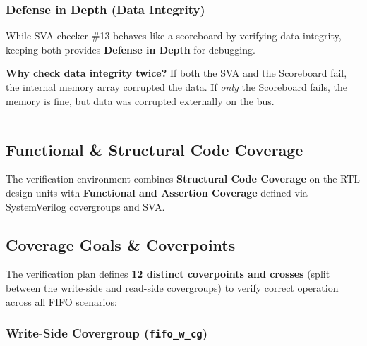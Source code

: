 \documentclass[
]{article}
\begin{document}
\subsubsection{Defense in Depth (Data
Integrity)}\label{defense-in-depth-data-integrity}

While SVA checker \#13 behaves like a scoreboard by verifying data
integrity, keeping both provides \textbf{Defense in Depth} for
debugging.

\textbf{Why check data integrity twice?} If both the SVA and the
Scoreboard fail, the internal memory array corrupted the data. If
\emph{only} the Scoreboard fails, the memory is fine, but data was
corrupted externally on the bus.

\begin{center}\rule{0.5\linewidth}{0.5pt}\end{center}

\subsection{Functional \& Structural Code
Coverage}\label{functional--structural-code-coverage}

The verification environment combines \textbf{Structural Code Coverage}
on the RTL design units with \textbf{Functional and Assertion Coverage}
defined via SystemVerilog covergroups and SVA.

\subsection{Coverage Goals \&
Coverpoints}\label{coverage-goals--coverpoints}

The verification plan defines \textbf{12 distinct coverpoints and
crosses} (split between the write-side and read-side covergroups) to
verify correct operation across all FIFO scenarios:

\subsubsection{\texorpdfstring{Write-Side Covergroup
(\texttt{fifo\_w\_cg})}{Write-Side Covergroup (fifo\_w\_cg)}}\label{write-side-covergroup-fifo_w_cg}
\end{document}
